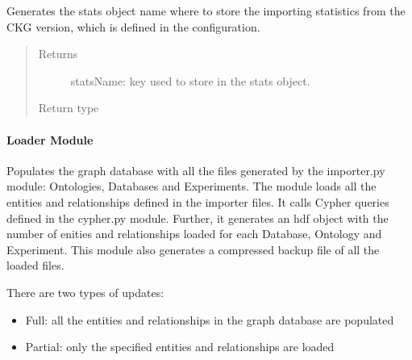 \documentclass[letterpaper,10pt,english]{sphinxmanual}
\begin{document}

\begin{fulllineitems}
\label{\detokenize{_autosummary/graphdb_builder.builder:graphdb_builder.builder.importer.getStatsName}}
Generates the stats object name where to store the importing statistics from the CKG version,     which is defined in the configuration.
\begin{quote}\begin{description}
\item[{Returns}] \leavevmode
statsName: key used to store in the stats object.

\item[{Return type}] \leavevmode
{}

\end{description}\end{quote}

\end{fulllineitems}



\paragraph{Loader Module}
\label{\detokenize{_autosummary/graphdb_builder.builder:module-graphdb_builder.builder.loader}}\label{\detokenize{_autosummary/graphdb_builder.builder:loader-module}}
Populates the graph database with all the files generated by the importer.py module:
Ontologies, Databases and Experiments.
The module loads all the entities and relationships defined in the importer files. It
calls Cypher queries defined in the cypher.py module. Further, it generates an hdf object
with the number of enities and relationships loaded for each Database, Ontology and Experiment.
This module also generates a compressed backup file of all the loaded files.

There are two types of updates:
\begin{itemize}
\item {} 
Full: all the entities and relationships in the graph database are populated

\item {} 
Partial: only the specified entities and relationships are loaded

\end{itemize}
\end{document}
